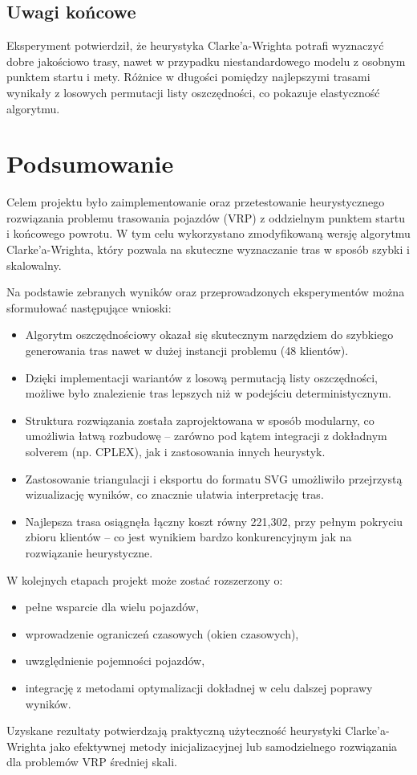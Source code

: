 \documentclass{article}
\begin{document}
\subsection*{Uwagi końcowe}

Eksperyment potwierdził, że heurystyka Clarke’a-Wrighta potrafi wyznaczyć dobre jakościowo trasy, nawet w przypadku niestandardowego modelu z osobnym punktem startu i mety. Różnice w długości pomiędzy najlepszymi trasami wynikały z losowych permutacji listy oszczędności, co pokazuje elastyczność algorytmu.
\section{Podsumowanie}

Celem projektu było zaimplementowanie oraz przetestowanie heurystycznego rozwiązania problemu trasowania pojazdów (VRP) z oddzielnym punktem startu i końcowego powrotu. W tym celu wykorzystano zmodyfikowaną wersję algorytmu Clarke’a-Wrighta, który pozwala na skuteczne wyznaczanie tras w sposób szybki i skalowalny.

Na podstawie zebranych wyników oraz przeprowadzonych eksperymentów można sformułować następujące wnioski:

\begin{itemize}
    \item Algorytm oszczędnościowy okazał się skutecznym narzędziem do szybkiego generowania tras nawet w dużej instancji problemu (48 klientów).
    \item Dzięki implementacji wariantów z losową permutacją listy oszczędności, możliwe było znalezienie tras lepszych niż w podejściu deterministycznym.
    \item Struktura rozwiązania została zaprojektowana w sposób modularny, co umożliwia łatwą rozbudowę – zarówno pod kątem integracji z dokładnym solverem (np. CPLEX), jak i zastosowania innych heurystyk.
    \item Zastosowanie triangulacji i eksportu do formatu SVG umożliwiło przejrzystą wizualizację wyników, co znacznie ułatwia interpretację tras.
    \item Najlepsza trasa osiągnęła łączny koszt równy 221{,}302, przy pełnym pokryciu zbioru klientów – co jest wynikiem bardzo konkurencyjnym jak na rozwiązanie heurystyczne.
\end{itemize}

W kolejnych etapach projekt może zostać rozszerzony o:
\begin{itemize}
    \item pełne wsparcie dla wielu pojazdów,
    \item wprowadzenie ograniczeń czasowych (okien czasowych),
    \item uwzględnienie pojemności pojazdów,
    \item integrację z metodami optymalizacji dokładnej w celu dalszej poprawy wyników.
\end{itemize}

Uzyskane rezultaty potwierdzają praktyczną użyteczność heurystyki Clarke’a-Wrighta jako efektywnej metody inicjalizacyjnej lub samodzielnego rozwiązania dla problemów VRP średniej skali.
\end{document}
